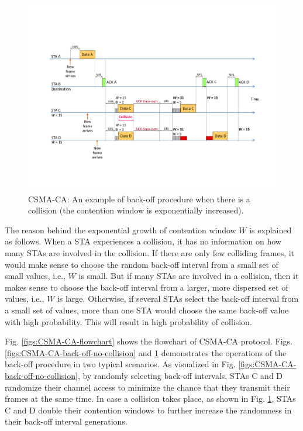 \documentclass[12pt,onecolumn]{article}
\begin{document}
\begin{figure}[!t]
\centering
\includegraphics[width=1.0\columnwidth]{figures2/CSMA-CA-back-off-with-collision}
\caption{CSMA-CA: An example of back-off procedure when there is a collision (the contention window is exponentially increased).}
\label{figs:CSMA-CA-back-off-with-collision}
\end{figure}

The reason behind the exponential growth of contention window $W$ is explained as follows. When a STA experiences a collision, it has no information on how many STAs are involved in the collision. If there are only few colliding frames, it would make sense to choose the random back-off interval from a small set of small values, i.e., $W$ is small. But if many STAs are involved in a collision, then it makes sense to choose the back-off interval from a larger, more dispersed set of values, i.e., $W$ is large. Otherwise, if several STAs select the back-off interval from a small set of values, more than one STA would choose the same back-off value with high probability. This will result in high probability of collision.

Fig. \ref{figs:CSMA-CA-flowchart} shows the flowchart of CSMA-CA protocol. Figs. \ref{figs:CSMA-CA-back-off-no-collision} and \ref{figs:CSMA-CA-back-off-with-collision} demonstrates the operations of the back-off procedure in two typical scenarios. As visualized in Fig. \ref{figs:CSMA-CA-back-off-no-collision}, by randomly selecting back-off intervals, STAs C and D randomize their channel access to minimize the chance that they transmit their frames at the same time. In case a collision takes place, as shown in Fig. \ref{figs:CSMA-CA-back-off-with-collision}, STAs C and D double their contention windows to further increase the randomness in their back-off interval generations.
\end{document}
